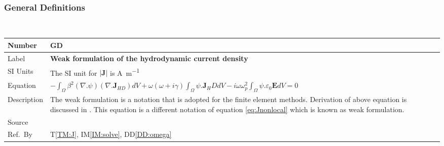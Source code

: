 \documentclass[12pt]{article}
\newcommand{\colAwidth}{0.13\textwidth}
\newcommand{\colBwidth}{0.82\textwidth}
\newcounter{defnum} %
\begin{document}
~\newline


\subsubsection{General Definitions}\label{sec_gendef}
~\newline
\noindent
\begin{minipage}{\textwidth}
	\renewcommand*{\arraystretch}{1.5}
	\begin{tabular}{| p{\colAwidth} | p{\colBwidth}|}
		\hline
		\rowcolor[gray]{0.9}
		Number& GD{defnum}\thedefnum \label{GD:weakJ}\\
		\hline
		Label &\bf Weak formulation of the hydrodynamic current density  \\
		\hline
		SI Units& The SI unit for $|\textbf{J}|$ is \si{\ampere \per \metre}\\
		\hline
		Equation&
		$-\int_\Omega \beta^2(\nabla.\psi)(\nabla.\textbf{J}_{HD})dV+\omega(\omega+i\gamma)\int_{\Omega} \psi. \textbf{J}_HD dV - i\omega \omega^2_p \int_\Omega \psi.\varepsilon_{0}\textbf{E}dV = 0 $  
		\\
		\hline
		Description &
The weak formulation is a notation that is adopted for the finite element methods. Derivation of above equation is discussed in \cite{hiremath2012numerical}. This equation is a different notation of equation \ref{eq:Jnonlocal} which is known as weak formulation.
\\
		\hline
		Source & \cite{hiremath2012numerical}  \\
		\hline
		Ref.\ By & T\ref{TM:J}, IM\ref{IM:solve}, DD\ref{DD:omega}\\
		\hline
	\end{tabular}
\end{minipage}\\


~\newline
\end{document}

